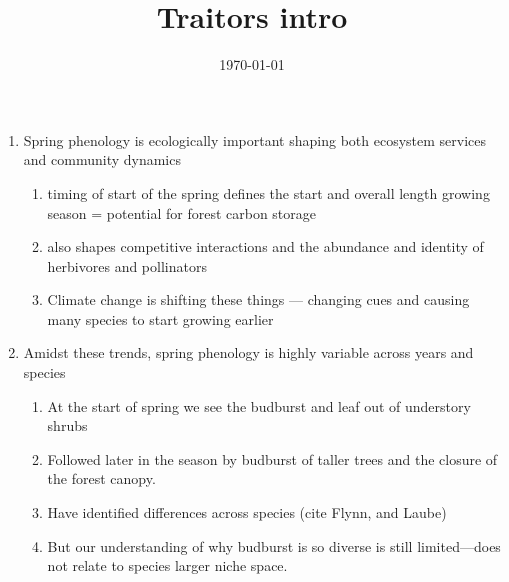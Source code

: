 \documentclass{article}
\begin{document}
\title{Traitors intro}
\date{\today}

\maketitle 


\begin{enumerate}
\item Spring phenology is ecologically important shaping both ecosystem services and community dynamics %
\begin{enumerate}
\item timing of start of the spring defines the start and overall length growing season = potential for forest carbon storage
\item also shapes competitive interactions and the abundance and identity of herbivores and pollinators 
\item Climate change is shifting these things --- changing cues and causing many species to start growing earlier
\end{enumerate}

\item Amidst these trends, spring phenology is highly variable across years and species %
\begin{enumerate}
\item At the start of spring we see the budburst and leaf out of understory shrubs %
\item Followed later in the season by budburst of taller trees and the closure of the forest canopy.
\item Have identified differences across species (cite Flynn, and Laube)
\item But our understanding of why budburst is so diverse is still limited---does not relate to species larger niche space.
\end{enumerate} 


\end{enumerate}
\end{document}
